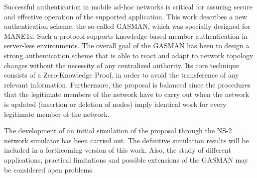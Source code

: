 \documentclass[conference]{IEEEtran}
\begin{document}
Successful authentication in mobile ad-hoc networks is critical for assuring secure and effective operation of the supported application. This work describes a new authentication scheme, the so-called GASMAN, which was
specially designed for MANETs. Such a protocol supports
knowledge-based member authentication  in server-less
environments. The overall goal of the GASMAN has been to design
a strong authentication scheme that is able to react and adapt to
network topology changes without the necessity of any centralized
authority. Its core technique consists of a Zero-Knowledge Proof,
in order to avoid the transference of any relevant information.
Furthermore, the proposal is balanced since the procedures that
the legitimate members of the network have to carry out when the
network is updated (insertion or deletion of nodes) imply
identical work for every legitimate member of the network.

The development of an initial simulation of the proposal through
the NS-2 network simulator has been carried out. The definitive
simulation results will be included in a forthcoming version of
this work. Also, the study of different applications, practical
limitations and possible extensions of the GASMAN may be
considered open problems.
\end{document}
